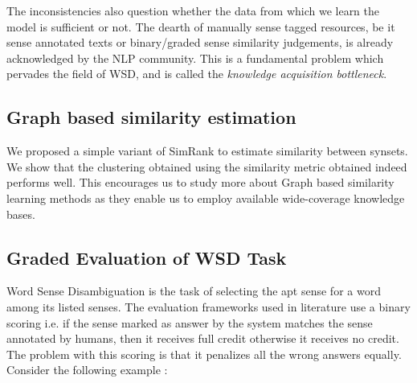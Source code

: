 The inconsistencies also question whether the data from which we learn the model is sufficient or not. The dearth of manually sense tagged resources, be it sense annotated texts or binary/graded sense similarity judgements, is already acknowledged by the NLP community. This is a fundamental problem which pervades the field of WSD, and is called the \textit{knowledge acquisition bottleneck}.

\begin{comment}
\subsection{Modifying Feature Space - Correlated Features}
Many features used in learning the Support Vector Machine are possibly correlated for eg. the $L1$ distance, $L2$  distance and the cosine similarity between the domain belongingness vectors of the two synsets. We can use techniques like Principal Component Analysis to convert a set of observations of possibly correlated variables into a set of values of linearly uncorrelated variables. One can also try to use systems like Deep Belief Networks \citep{hinton2006DBN} to get combinations of features which can be more differentiating than the original set of features.
\end{comment}

\subsection{Graph based similarity estimation}
We proposed a simple variant of SimRank \citep{Jeh02simrank} to estimate similarity between synsets. We show that the clustering obtained using the similarity metric obtained indeed performs well. This encourages us to study more about Graph based similarity learning methods as they enable us to employ available wide-coverage knowledge bases.

\subsection{Graded Evaluation of WSD Task}
Word Sense Disambiguation is the task of selecting the apt sense for a word among its listed senses. The evaluation frameworks used in literature use a binary scoring i.e. if the sense marked as answer by the system matches the sense annotated by humans, then it receives full credit otherwise it receives no credit. The problem with this scoring is that it penalizes all the wrong answers equally. Consider the following example :

